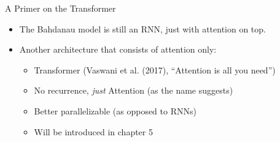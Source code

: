 
\begin{vbframe}{A Primer on the Transformer}

\vfill

\begin{itemize}
	\item The Bahdanau model is still an RNN, just with attention on top.
	\item Another architecture that consists of attention only: 
		\begin{itemize}
			\item Transformer (Vaswani et al. (2017), ``Attention is all you need'')
			\item No recurrence, \textit{just} Attention (as the name suggests)
			\item Better parallelizable (as opposed to RNNs)
			\item Will be introduced in chapter 5
		\end{itemize}
\end{itemize}

\vfill

\end{vbframe}


\endlecture



